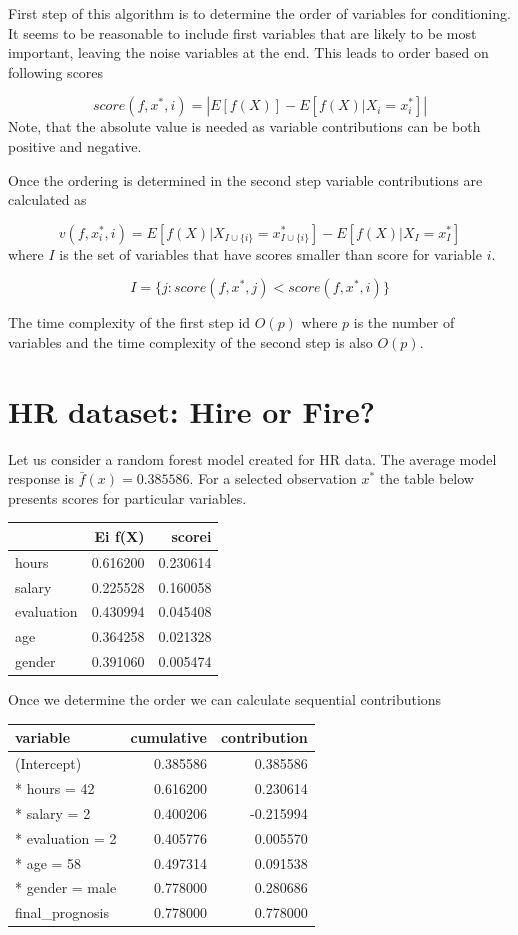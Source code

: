 \documentclass[]{book}
\theoremstyle{definition}
\theoremstyle{definition}
\theoremstyle{definition}
\theoremstyle{remark}
\begin{document}
First step of this algorithm is to determine the order of variables for
conditioning. It seems to be reasonable to include first variables that
are likely to be most important, leaving the noise variables at the end.
This leads to order based on following scores

\[
score(f, x^*, i) = \left| E [f(X)] - E [f(X)|X_i = x^*_i] \right|
\] Note, that the absolute value is needed as variable contributions can
be both positive and negative.

Once the ordering is determined in the second step variable
contributions are calculated as

\[
v(f, x^*_i, i) = E [f(X) | X_{I \cup \{i\}} = x_{I \cup \{i\}}^*] - E [f(X) | X_{I} = x_{I}^*] 
\] where \(I\) is the set of variables that have scores smaller than
score for variable \(i\).

\[
I = \{j: score(f, x^*, j) < score(f, x^*, i)\}
\]

The time complexity of the first step id \(O(p)\) where \(p\) is the
number of variables and the time complexity of the second step is also
\(O(p)\).

\hypertarget{hr-dataset-hire-or-fire}{%
\section{HR dataset: Hire or Fire?}\label{hr-dataset-hire-or-fire}}

Let us consider a random forest model created for HR data. The average
model response is \(\bar f(x) = 0.385586\). For a selected observation
\(x^*\) the table below presents scores for particular variables.

\begin{longtable}[]{@{}lrr@{}}
\toprule
& Ei f(X) & scorei\tabularnewline
\midrule
\endhead
hours & 0.616200 & 0.230614\tabularnewline
salary & 0.225528 & 0.160058\tabularnewline
evaluation & 0.430994 & 0.045408\tabularnewline
age & 0.364258 & 0.021328\tabularnewline
gender & 0.391060 & 0.005474\tabularnewline
\bottomrule
\end{longtable}

Once we determine the order we can calculate sequential contributions

\begin{longtable}[]{@{}lrr@{}}
\toprule
variable & cumulative & contribution\tabularnewline
\midrule
\endhead
(Intercept) & 0.385586 & 0.385586\tabularnewline
* hours = 42 & 0.616200 & 0.230614\tabularnewline
* salary = 2 & 0.400206 & -0.215994\tabularnewline
* evaluation = 2 & 0.405776 & 0.005570\tabularnewline
* age = 58 & 0.497314 & 0.091538\tabularnewline
* gender = male & 0.778000 & 0.280686\tabularnewline
final\_prognosis & 0.778000 & 0.778000\tabularnewline
\bottomrule
\end{longtable}
\end{document}
